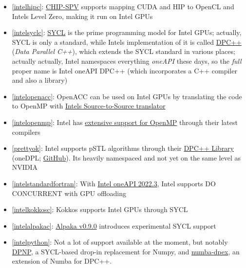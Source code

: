 \begin{frame}[allowframebreaks]
\begin{itemize}
        \item \ref{intelhipc}: \href{https://github.com/CHIP-SPV/chip-spv}{CHIP-SPV} supports mapping CUDA and HIP to OpenCL and Intel\textquotesingle s Level Zero, making it run on Intel GPUs
        \item \ref{intelsyclc}: \href{https://www.khronos.org/sycl/}{SYCL} is the prime programming model for Intel GPUs; actually, SYCL is only a standard, while Intel\textquotesingle s implementation of it is called \href{https://www.intel.com/content/www/us/en/developer/tools/oneapi/data-parallel-c-plus-plus.html}{DPC++} (\emph{Data Parallel C++}), which extends the SYCL standard in various places; actually actually, Intel namespaces everything \emph{oneAPI} these days, so the \emph{full} proper name is Intel oneAPI DPC++ (which incorporates a C++ compiler and also a library)
        \item \ref{intelopenacc}: OpenACC can be used on Intel GPUs by translating the code to OpenMP with \href{https://github.com/intel/intel-application-migration-tool-for-openacc-to-openmp}{Intel\textquotesingle s Source-to-Source translator}
        \item \ref{intelopenmp}: Intel has \href{https://www.intel.com/content/www/us/en/develop/documentation/get-started-with-cpp-fortran-compiler-openmp/top.html}{extensive support for OpenMP} through their latest compilers
        \item \ref{prettyok}: Intel supports pSTL algorithms through their \href{https://www.intel.com/content/www/us/en/developer/tools/oneapi/dpc-library.html\#gs.fifrh5}{DPC++ Library} (oneDPL; \href{https://github.com/oneapi-src/oneDPL}{GitHub}). It\textquotesingle s heavily namespaced and not yet on the same level as NVIDIA
        \item \ref{intelstandardfortran}: With \href{https://www.intel.com/content/www/us/en/developer/articles/release-notes/fortran-compiler-release-notes.html}{Intel oneAPI 2022.3}, Intel supports DO CONCURRENT with GPU offloading
        \item \ref{intelkokkosc}: Kokkos supports Intel GPUs through SYCL
        \item \ref{intelalpakac}: \href{https://github.com/alpaka-group/alpaka/releases/tag/0.9.0}{Alpaka v0.9.0} introduces experimental SYCL support
        \item \ref{intelpython}: Not a lot of support available at the moment, but notably \href{https://intelpython.github.io/dpnp/}{DPNP}, a SYCL-based drop-in replacement for Numpy, and \href{https://github.com/IntelPython/numba-dpex}{numba-dpex}, an extension of Numba for DPC++.
    \end{itemize}
\end{frame}